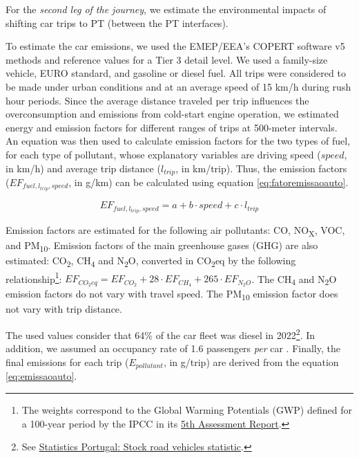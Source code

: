 \documentclass[review, doubleblind, 3p,
authoryear]{elsarticle} %
\begin{document}
For the \emph{second leg of the journey}, we estimate the environmental
impacts of shifting car trips to PT (between the PT interfaces).

To estimate the car emissions, we used the EMEP/EEA's COPERT software v5
methods and reference values \citep{COPERT} for a Tier 3 detail level.
We used a family-size vehicle, EURO standard, and gasoline or diesel
fuel. All trips were considered to be made under urban conditions and at
an average speed of 15 km/h during rush hour periods. Since the average
distance traveled per trip influences the overconsumption and emissions
from cold-start engine operation, we estimated energy and emission
factors for different ranges of trips at 500-meter intervals.\\
An equation was then used to calculate emission factors for the two
types of fuel, for each type of pollutant, whose explanatory variables
are driving speed (\(speed\), in km/h) and average trip distance
(\(l_{trip}\), in km/trip). Thus, the emission factors
(\(EF_{fuel,l_{trip},speed}\), in g/km) can be calculated using equation
\ref{eq:fatoremissaoauto}.

\begin{equation}\label{eq:fatoremissaoauto}
{EF}_{fuel,l_{trip},speed} = a + b\cdot {speed} + c\cdot l_{trip}
\end{equation}

Emission factors are estimated for the following air pollutants: CO,
NO\textsubscript{X}, VOC, and PM\textsubscript{10}. Emission factors of
the main greenhouse gases (GHG) are also estimated: CO\textsubscript{2},
CH\textsubscript{4} and N\textsubscript{2}O, converted in
CO\textsubscript{2}eq by the following relationship\footnote{The weights
  correspond to the Global Warming Potentials (GWP) defined for a
  100-year period by the IPCC in its
  \href{https://www.ipcc.ch/report/ar5/}{5th Assessment Report}.}:
\(EF_{CO_2eq} = EF_{CO_2} + 28\cdot EF_{CH_4} + 265\cdot EF_{N_2O}\).
The CH\textsubscript{4} and N\textsubscript{2}O emission factors do not
vary with travel speed. The PM\textsubscript{10} emission factor does
not vary with trip distance.

The used values consider that 64\% of the car fleet was diesel in
2022\footnote{See
  \href{https://smi.ine.pt/Indicador/Detalhes/10837?LANG=EN}{Statistics
  Portugal: Stock road vehicles statistic}.}. In addition, we assumed an
occupancy rate of 1.6 passengers \emph{per} car \citep{IMOB}. Finally,
the final emissions for each trip (\(E_{pollutant}\), in g/trip) are
derived from the equation \ref{eq:emissaoauto}.
\end{document}
